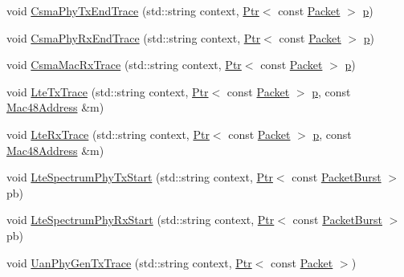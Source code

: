 \begin{DoxyCompactItemize}
\item 
void \hyperlink{classns3_1_1AnimationInterface_ad3d82da5ad705ec6c7be332fd1fcc911}{Csma\+Phy\+Tx\+End\+Trace} (std\+::string context, \hyperlink{classns3_1_1Ptr}{Ptr}$<$ const \hyperlink{classns3_1_1Packet}{Packet} $>$ \hyperlink{lte__link__budget__x2__handover__measures_8m_ac9de518908a968428863f829398a4e62}{p})
\item 
void \hyperlink{classns3_1_1AnimationInterface_a031728e043bab0338deb86aa5f0a1c26}{Csma\+Phy\+Rx\+End\+Trace} (std\+::string context, \hyperlink{classns3_1_1Ptr}{Ptr}$<$ const \hyperlink{classns3_1_1Packet}{Packet} $>$ \hyperlink{lte__link__budget__x2__handover__measures_8m_ac9de518908a968428863f829398a4e62}{p})
\item 
void \hyperlink{classns3_1_1AnimationInterface_a8ca49462ea639259c8b967d8a020d93f}{Csma\+Mac\+Rx\+Trace} (std\+::string context, \hyperlink{classns3_1_1Ptr}{Ptr}$<$ const \hyperlink{classns3_1_1Packet}{Packet} $>$ \hyperlink{lte__link__budget__x2__handover__measures_8m_ac9de518908a968428863f829398a4e62}{p})
\item 
void \hyperlink{classns3_1_1AnimationInterface_a4bcc6c6e4eaa0243190e94c74cd4d59e}{Lte\+Tx\+Trace} (std\+::string context, \hyperlink{classns3_1_1Ptr}{Ptr}$<$ const \hyperlink{classns3_1_1Packet}{Packet} $>$ \hyperlink{lte__link__budget__x2__handover__measures_8m_ac9de518908a968428863f829398a4e62}{p}, const \hyperlink{classns3_1_1Mac48Address}{Mac48\+Address} \&m)
\item 
void \hyperlink{classns3_1_1AnimationInterface_a1b44e17f04eb8cdb33de77c7ec544cd6}{Lte\+Rx\+Trace} (std\+::string context, \hyperlink{classns3_1_1Ptr}{Ptr}$<$ const \hyperlink{classns3_1_1Packet}{Packet} $>$ \hyperlink{lte__link__budget__x2__handover__measures_8m_ac9de518908a968428863f829398a4e62}{p}, const \hyperlink{classns3_1_1Mac48Address}{Mac48\+Address} \&m)
\item 
void \hyperlink{classns3_1_1AnimationInterface_a3f0131dc28ccba541c2ef52bbc920e62}{Lte\+Spectrum\+Phy\+Tx\+Start} (std\+::string context, \hyperlink{classns3_1_1Ptr}{Ptr}$<$ const \hyperlink{classns3_1_1PacketBurst}{Packet\+Burst} $>$ pb)
\item 
void \hyperlink{classns3_1_1AnimationInterface_a476014043547ee8c36cdbd92324c938f}{Lte\+Spectrum\+Phy\+Rx\+Start} (std\+::string context, \hyperlink{classns3_1_1Ptr}{Ptr}$<$ const \hyperlink{classns3_1_1PacketBurst}{Packet\+Burst} $>$ pb)
\item 
void \hyperlink{classns3_1_1AnimationInterface_a7cf0290a1181de6f4614696e5f3ea906}{Uan\+Phy\+Gen\+Tx\+Trace} (std\+::string context, \hyperlink{classns3_1_1Ptr}{Ptr}$<$ const \hyperlink{classns3_1_1Packet}{Packet} $>$)

\end{DoxyCompactItemize}
